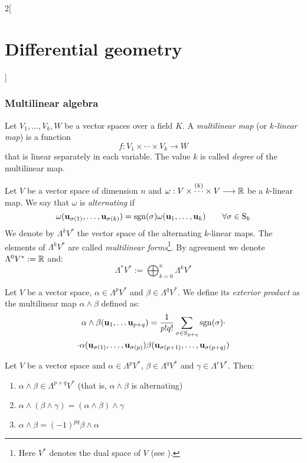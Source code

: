 \documentclass[../../../main_math.tex]{subfiles}
\begin{document}
\begin{multicols}{2}[\section{Differential geometry}]
  \subsubsection{Multilinear algebra}
  \begin{definition}
    Let $V_1,\ldots,V_k,W$ be a vector spaces over a field $K$. A \emph{multilinear map} (or \emph{$k$-linear map}) is a function $$f:V_1\times\cdots\times V_k\longrightarrow W$$ that is linear separately in each variable. The value $k$ is called \emph{degree} of the multilinear map.
  \end{definition}
  \begin{definition}
    Let $V$ be a vector space of dimension $n$ and $\omega:V\times\overset{(k)}{\cdots}\times V\longrightarrow \mathbb{R}$ be a $k$-linear map. We say that $\omega$ is \emph{alternating} if $$\omega(\boldsymbol{\mathrm{u}}_{\sigma(1)},\ldots,\boldsymbol{\mathrm{u}}_{\sigma(k)})=\operatorname{sgn}(\sigma)\omega(\boldsymbol{\mathrm{u}}_1,\ldots,\boldsymbol{\mathrm{u}}_k)\qquad\forall\sigma\in \text{S}_k$$
    We denote by $\Lambda^kV^*$ the vector space of the alternating $k$-linear maps. The elements of $\Lambda^kV^*$ are called \emph{multilinear forms}\footnote{Here $V^*$ denotes the dual space of $V$ (see ).}. By agreement we denote $\Lambda^0V^*:=\mathbb{R}$ and: $$\Lambda^*V^*:=\bigoplus_{k=0}^{n}\Lambda^kV^*$$
  \end{definition}
  \begin{definition}
    Let $V$ be a vector space, $\alpha\in\Lambda^pV^*$ and $\beta\in\Lambda^qV^*$. We define its \emph{exterior product} as the multilinear map $\alpha\wedge\beta$ defined as:
    \begin{multline*}
      \alpha\wedge\beta(\boldsymbol{\mathrm{u}}_1,\ldots\boldsymbol{\mathrm{u}}_{p+q})=\frac{1}{p!q!}\sum_{\sigma\in \text{S}_{p+q}}\operatorname{sgn}(\sigma)\cdot\\\cdot\alpha(\boldsymbol{\mathrm{u}}_{\sigma(1)},\ldots,\boldsymbol{\mathrm{u}}_{\sigma(p)})\beta(\boldsymbol{\mathrm{u}}_{\sigma(p+1)},\ldots,\boldsymbol{\mathrm{u}}_{\sigma(p+q)})
    \end{multline*}
  \end{definition}
  \begin{proposition}
    Let $V$ be a vector space and $\alpha\in\Lambda^pV^*$, $\beta\in\Lambda^qV^*$ and $\gamma\in\Lambda^rV^*$. Then:
    \begin{enumerate}
      \item $\alpha\wedge\beta\in\Lambda^{p+q}V^*$ (that is, $\alpha\wedge\beta$ is alternating)
      \item $\alpha\wedge(\beta\wedge\gamma)=(\alpha\wedge\beta)\wedge\gamma$
      \item $\alpha\wedge\beta={(-1)}^{pq}\beta\wedge\alpha$

\end{enumerate}
\end{proposition}
\end{multicols}
\end{document}

